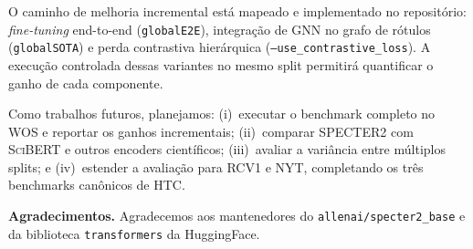 \documentclass[11pt,a4paper,twoside]{article}
\begin{document}
O caminho de melhoria incremental está mapeado e implementado no repositório:
\textit{fine-tuning} end-to-end (\texttt{globalE2E}), integração de GNN no grafo
de rótulos (\texttt{globalSOTA}) e perda contrastiva hierárquica
(\texttt{--use\_contrastive\_loss}). A execução controlada dessas variantes no
mesmo split permitirá quantificar o ganho de cada componente.

Como trabalhos futuros, planejamos: (i)~executar o benchmark completo no WOS e
reportar os ganhos incrementais; (ii)~comparar \textsc{SPECTER2} com
\textsc{SciBERT} e outros encoders científicos; (iii)~avaliar a variância entre
múltiplos splits; e (iv)~estender a avaliação para RCV1 e NYT, completando os
três benchmarks canônicos de HTC.

\vspace{0.6em}
\noindent\textbf{Agradecimentos.}
Agradecemos aos mantenedores do \texttt{allenai/specter2\_base}
\cite{cohan2020specter} e da biblioteca \texttt{transformers} da HuggingFace.
\end{document}
